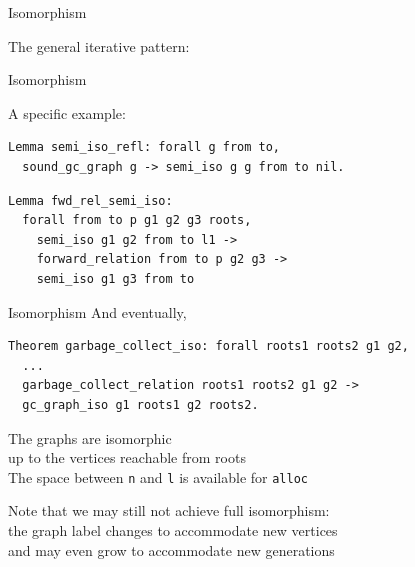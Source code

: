 \documentclass[usenames, xcolor=dvipsnames]{beamer}
\begin{document}
\begin{frame}[fragile]{Isomorphism}

The general iterative pattern:

\bigskip

\begin{center}
\end{center}
\end{frame}

\begin{frame}[fragile]{Isomorphism}

A specific example:
\begin{Verbatim}
Lemma semi_iso_refl: forall g from to,
  sound_gc_graph g -> semi_iso g g from to nil.
\end{Verbatim}
\pause
\begin{Verbatim}
Lemma fwd_rel_semi_iso:
  forall from to p g1 g2 g3 roots,
    semi_iso g1 g2 from to l1 -> 
    forward_relation from to p g2 g3 ->
    semi_iso g1 g3 from to
\end{Verbatim}
\end{frame}

\begin{frame}[fragile]{Isomorphism}
And eventually, 
\begin{Verbatim}
Theorem garbage_collect_iso: forall roots1 roots2 g1 g2,
  ...
  garbage_collect_relation roots1 roots2 g1 g2 ->
  gc_graph_iso g1 roots1 g2 roots2.
\end{Verbatim}

\bigskip \pause

The graphs are \alert{isomorphic} 
\\\hspace{1em}\alert{up to the vertices reachable from roots}\\
The space between \texttt{n} and \texttt{l} is \alert{available for \texttt{alloc}}

\bigskip \pause

Note that we may still not achieve full isomorphism:
\\\hspace{1em}the \alert{graph label} changes to accommodate new vertices
\\\hspace{2em}and may even grow to accommodate new generations


\end{frame}
\end{document}
